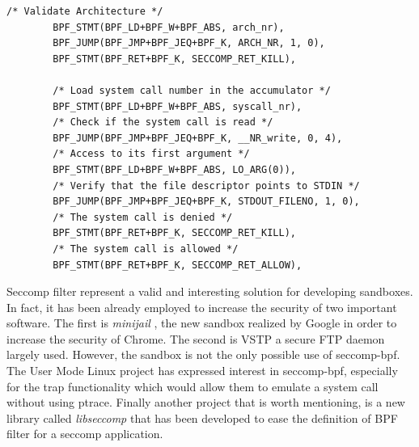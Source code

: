 \begin{center}
\lstset{escapechar=@,style=c_num}
\begin{lstlisting}[label=bpf_filter,caption={BPF filter ensuring that a program can write only over the standard output}]
		/* Validate Architecture */
		BPF_STMT(BPF_LD+BPF_W+BPF_ABS, arch_nr), 
		BPF_JUMP(BPF_JMP+BPF_JEQ+BPF_K, ARCH_NR, 1, 0), 
		BPF_STMT(BPF_RET+BPF_K, SECCOMP_RET_KILL), 
		
		/* Load system call number in the accumulator */
		BPF_STMT(BPF_LD+BPF_W+BPF_ABS, syscall_nr),
		/* Check if the system call is read */
		BPF_JUMP(BPF_JMP+BPF_JEQ+BPF_K, __NR_write, 0, 4),
		/* Access to its first argument */
		BPF_STMT(BPF_LD+BPF_W+BPF_ABS, LO_ARG(0)),
		/* Verify that the file descriptor points to STDIN */
		BPF_JUMP(BPF_JMP+BPF_JEQ+BPF_K, STDOUT_FILENO, 1, 0),
		/* The system call is denied */
		BPF_STMT(BPF_RET+BPF_K, SECCOMP_RET_KILL),
		/* The system call is allowed */
		BPF_STMT(BPF_RET+BPF_K, SECCOMP_RET_ALLOW),

\end{lstlisting}
\end{center}

Seccomp filter represent a valid and interesting solution for developing sandboxes. In  fact, it has been already employed to increase the security of two important software. The first is \emph{minijail} \cite{minijail}, the new sandbox realized by Google in order to increase the security of Chrome. The second is VSTP \cite{vstp} a secure FTP daemon largely used. However, the sandbox is not the only possible use of seccomp-bpf. The User Mode Linux project has expressed interest in seccomp-bpf, especially for the trap functionality which would allow them to emulate a system call without using ptrace. Finally another project that is worth mentioning, is a new library called \emph{libseccomp} \cite{libseccomp} that has been developed to ease the definition of BPF filter for a seccomp application.   
